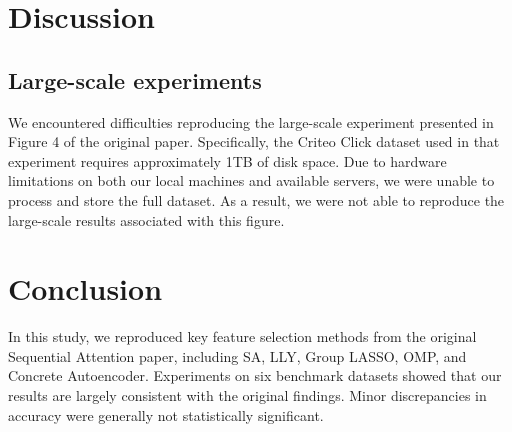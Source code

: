 \documentclass[a4paper,twocolumn]{article} %
\begin{document}
\begin{table}[ht]
\centering
\caption{Comparison of accuracy using all features. p-values are from one-sample t-tests against Lemhadri (2021)~\cite{lemhadri2021lassonet} and Yasuda (2023)'s reported means.}
\label{tab:all-feature-pval}
\end{table}
\section{Discussion}


\subsection{ Large-scale experiments}
We encountered difficulties reproducing the large-scale experiment presented in Figure 4 of the original paper. Specifically, the Criteo Click dataset used in that experiment requires approximately 1TB of disk space. 
Due to hardware limitations on both our local machines and available servers, we were unable to process and store the full dataset. 
As a result, we were not able to reproduce the large-scale results associated with this figure.

\section{Conclusion}
In this study, we reproduced key feature selection methods from the original Sequential Attention paper, including SA, LLY, Group LASSO, OMP, and Concrete Autoencoder. Experiments on six benchmark datasets showed that our results are largely consistent with the original findings. Minor discrepancies in accuracy were generally not statistically significant.
\end{document}
